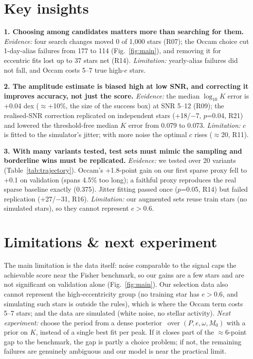 \documentclass{article}
\begin{document}
\section{Key insights}
\textbf{1. Choosing among candidates matters more than searching for them.}
\emph{Evidence:} four search changes moved 0 of 1,000 stars (R07); the Occam
choice cut 1-day-alias failures from 177 to 114 (Fig.~\ref{fig:main}), and
removing it for eccentric fits lost up to 37 stars net (R14). \emph{Limitation:}
yearly-alias failures did not fall, and Occam costs 5--7 true high-$e$ stars.

\textbf{2. The amplitude estimate is biased high at low SNR, and correcting it
improves accuracy, not just the score.} \emph{Evidence:} the median $\log_{10}K$
error is +0.04 dex ($\approx$+10\%, the size of the success box) at SNR 5--12
(R09); the realised-SNR correction replicated on independent stars (+18/$-$7,
$p$=0.04, R21) and lowered the threshold-free median $K$ error from 0.079 to
0.073. \emph{Limitation:} $c$ is fitted to the simulator's jitter; with more
noise the optimal $c$ rises ($\approx$20, R11).

\textbf{3. With many variants tested, test sets must mimic the sampling and
borderline wins must be replicated.} \emph{Evidence:} we tested over 20
variants (Table~\ref{tab:trajectory}). Occam's +1.8-point gain on our first
sparse proxy fell to +0.1 on validation (spans 4.5\% too long); a faithful
proxy reproduces the real sparse baseline exactly (0.375). Jitter fitting passed once ($p$=0.05, R14) but failed replication
(+27/$-$31, R16). \emph{Limitation:} our augmented sets reuse train stars
(no simulated stars), so they cannot represent $e>0.6$.

\section{Limitations \& next experiment}
The main limitation is the data itself: noise comparable to the signal
caps the achievable score near the Fisher benchmark, so our gains are a few
stars and are not significant on validation alone (Fig.~\ref{fig:main}).
Our selection data also cannot represent the high-eccentricity group (no
training star has $e>0.6$, and simulating such stars is outside the rules),
which is where the Occam term costs 5--7 stars; and the data are
simulated (white noise, no stellar activity). \emph{Next experiment:} choose the period from a dense
posterior~\cite{pricewhelan2017} over $(P, e, \omega, M_0)$ with a prior on $K$, instead of a
single best fit per peak. If it closes part of the $\approx$6-point gap to
the benchmark, the gap is partly a choice problem; if not, the remaining
failures are genuinely ambiguous and our model is near the practical
limit.
\end{document}
